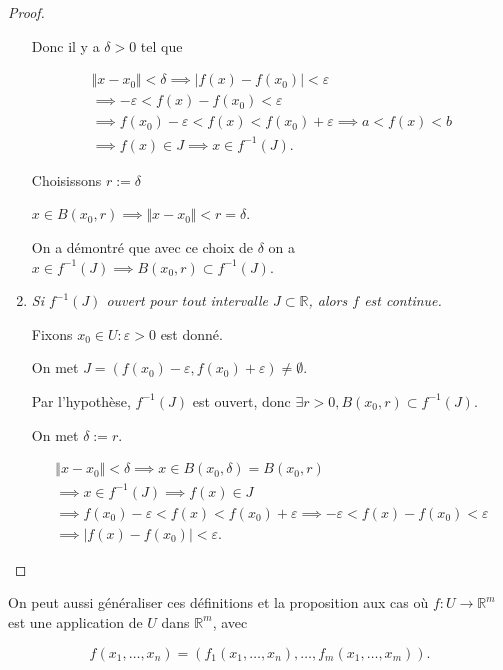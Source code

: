 \documentclass[french]{article}
\theoremstyle{definition}
\theoremstyle{remark}
\newcommand{\lesss}{<}
\newcommand{\less}{\lesss}
\newcommand{\biggg}{>}
\newcommand{\bg}{\biggg}
\begin{document}
\begin{proof}
\begin{enumerate}
    Donc il y a $\delta \bg 0$ tel que

    \begin{gather*}
      \Vert x-x_0 \Vert \less \delta  \implies \lvert f(x)- f(x_0) \rvert \less \varepsilon \\
      \implies - \varepsilon \less f(x) -f(x_0) \less \varepsilon \\
      \implies f(x_0) - \varepsilon \less f(x) \less f(x_0)+ \varepsilon \implies a \less f(x) \less b \\
      \implies f(x) \in J \implies x \in f ^{-1} (J).
    \end{gather*}

    Choisissons $r := \delta $

    $x \in B(x_0, r) \implies \Vert x-x_0 \Vert \less r=\delta  $.

    On a démontré que avec ce choix de $\delta $ on a $x \in f ^{-1} (J) \implies B(x_0, r) \subset f ^{-1} (J)$.

    \item \emph{Si $f ^{-1} (J)$ ouvert pour tout intervalle $J \subset \mathbb{R}$, alors $f$ est continue.}

    Fixons $x_0 \in U : \varepsilon \bg 0$ est donné.

    On met $J = (f(x_0) - \varepsilon , f(x_0)+ \varepsilon ) \neq \emptyset$.

    Par l'hypothèse, $f ^{-1} (J)$ est ouvert, donc $\exists r \bg 0, B(x_0, r) \subset f ^{-1} (J)$.

    On met $\delta := r$.

    \begin{gather*}
      \Vert x-x_0 \Vert \less \delta \implies x \in B(x_0, \delta ) = B(x_0, r)\\
      \implies x \in f ^{-1} (J) \implies f(x) \in J \\
      \implies f(x_0) - \varepsilon \less f(x) \less f(x_0) + \varepsilon \implies - \varepsilon \less f(x) - f(x_0) \less \varepsilon \\
      \implies \lvert f(x) - f(x_0) \rvert \less \varepsilon .
    \end{gather*}
  \end{enumerate}
\end{proof}

On peut aussi généraliser ces définitions et la proposition aux cas où $f: U \to \mathbb{R}^m$ est une application de $U$ dans $\mathbb{R}^m$, avec

$$ f(x_1, \dots, x_n) = (f_1(x_1, \dots, x_n), \dots, f_m(x_1, \dots, x_m)).$$
\end{document}
